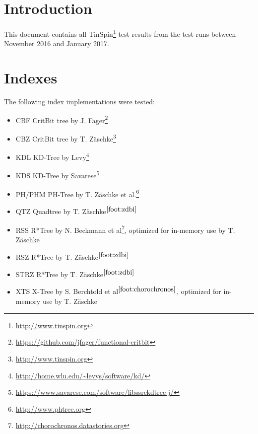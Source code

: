 \documentclass{sig-alternate}
\makeatletter
\def\doi#1{\gdef\@doi{#1}}\def\@doi{}
\makeatother
\begin{document}




\maketitle

\section{Introduction}

This document contains all TinSpin\footnote{\url{http://www.tinspin.org}} test results from the test runs between November 2016 and January 2017.

\section{Indexes}

The following index implementations were tested:

\begin{itemize}
	\item CBF CritBit tree by J. Fager\footnote{\url{https://github.com/jfager/functional-critbit}}
	\item CBZ CritBit tree by T. Z\"{a}schke\footnote{\url{http://www.tinspin.org}\label{foot:zdbi}}
	\item KDL KD-Tree by Levy\footnote{\url{http://home.wlu.edu/~levys/software/kd/}}
	\item KDS KD-Tree by Savarese\footnote{\url{https://www.savarese.com/software/libssrckdtree-j/}}
	\item PH/PHM PH-Tree by T. Z\"{a}schke et al.\footnote{\url{http://www.phtree.org}}
	\item QTZ Quadtree by T. Z\"{a}schke$^{\ref{foot:zdbi}}$
	\item RSS R*Tree by N. Beckmann et al\footnote{\url{http://chorochronos.datastories.org}\label{foot:chorochronos}}, optimized for in-memory use by T. Z\"{a}schke
	\item RSZ R*Tree by T. Z\"{a}schke$^{\ref{foot:zdbi}}$
	\item STRZ R*Tree by T. Z\"{a}schke$^{\ref{foot:zdbi}}$
	\item XTS X-Tree by S. Berchtold et al$^{\ref{foot:chorochronos}}$, optimized for in-memory use by T. Z\"{a}schke
\end{itemize}
\end{document}
